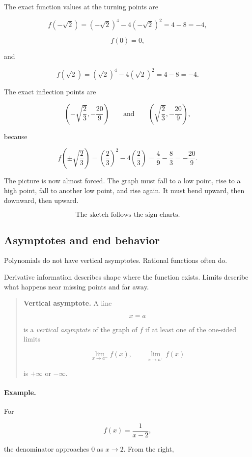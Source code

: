 The exact function values at the turning points are

\[
f(-\sqrt2)=(-\sqrt2)^4-4(-\sqrt2)^2=4-8=-4,
\]

\[
f(0)=0,
\]

and

\[
f(\sqrt2)=(\sqrt2)^4-4(\sqrt2)^2=4-8=-4.
\]

The exact inflection points are

\[
\left(-\sqrt{\frac23},-\frac{20}{9}\right)
\qquad\text{and}\qquad
\left(\sqrt{\frac23},-\frac{20}{9}\right),
\]

because

\[
f\left(\pm\sqrt{\frac23}\right)
=
\left(\frac23\right)^2-4\left(\frac23\right)
=
\frac49-\frac83
=
-\frac{20}{9}.
\]

The picture is now almost forced.  The graph must fall to a low point, rise to a high
point, fall to another low point, and rise again.  It must bend upward, then downward,
then upward.

\[
\boxed{
\text{The sketch follows the sign charts.}
}
\]

\subsection{Asymptotes and end behavior}
\label{subsec:asymptotes-end-behavior}

Polynomials do not have vertical asymptotes.  Rational functions often do.

Derivative information describes shape where the function exists.  Limits describe what
happens near missing points and far away.

\begin{quote}
\textbf{Vertical asymptote.}
A line

\[
x=a
\]

is a \emph{vertical asymptote} of the graph of \(f\) if at least one of the one-sided
limits

\[
\lim_{x\to a^-} f(x),
\qquad
\lim_{x\to a^+} f(x)
\]

is \(+\infty\) or \(-\infty\).
\end{quote}

\paragraph{Example.}
For

\[
f(x)=\frac1{x-2},
\]

the denominator approaches \(0\) as \(x\to2\).  From the right,

